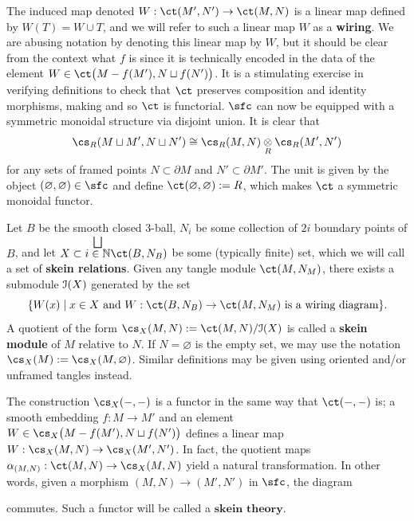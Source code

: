 
The induced map denoted $W: \ct(M', N') \to \ct(M, N)$ is a linear map defined by $W(T) = W \cup T$, and we will refer to such a linear map $W$ as a \textbf{wiring}. We are abusing notation by denoting this linear map by $W$, but it should be clear from the context what $f$ is since it is technically encoded in the data of the element $W \in \ct\big( M-f(M'), N \sqcup f(N') \big)$. It is a stimulating exercise in verifying definitions to check that $\ct$ preserves composition and identity morphisms, making and so $\ct$ is functorial. $\sfc$ can now be equipped with a symmetric monoidal structure via disjoint union. It is clear that 
\[\cs_R(M \sqcup M', N \sqcup N') \cong \cs_R(M, N) \underset{R}{\otimes} \cs_R(M', N')\]
for any sets of framed points $N \subset \partial M$ and $N' \subset \partial M'$. The unit is given by the object $(\varnothing, \varnothing) \in \sfc$ and define $\ct(\varnothing, \varnothing) := R$, which makes $\ct$ a symmetric monoidal functor. 

\begin{definition}
Let $B$ be the smooth closed $3$-ball, $N_i$ be some collection of $2i$ boundary points of $B$, and let $X \subset \overset{\bigsqcup}{i \in \N} \ct(B, N_B)$ be some (typically finite) set, which we will call a set of \textbf{skein relations}. Given any tangle module $\ct(M, N_M)$, there exists a submodule $\mathcal{I}(X)$ generated by the set 
\[\{ W(x) \mid x \in X \text{ and } W:\ct(B, N_B) \to \ct(M, N_M) \text{ is a wiring diagram} \}.\] 
A quotient of the form $\cs_X(M, N) := \ct(M, N) / \ci(X)$ is called a \textbf{skein module} of $M$ relative to $N$. If $N = \varnothing$ is the empty set, we may use the notation $\cs_X(M) := \cs_X(M, \varnothing)$. Similar definitions may be given using oriented and/or unframed tangles instead. 
\end{definition}
The construction $\cs_X(-, -)$ is a functor in the same way that $\ct(-, -)$ is; a smooth embedding $f: M \to M'$ and an element $W \in \cs_X\big( M-f(M'), N \sqcup f(N') \big)$ defines a linear map $W: \cs_X(M, N) \to \cs_X(M', N')$. In fact, the quotient maps $\alpha_{(M, N)}: \ct(M, N) \to \cs_X(M, N)$ yield a natural transformation. In other words, given a morphism $(M, N) \to (M', N')$ in $\sfc$, the diagram
\begin{center}
\end{center}
commutes. Such a functor will be called a $\textbf{skein theory}$. 

